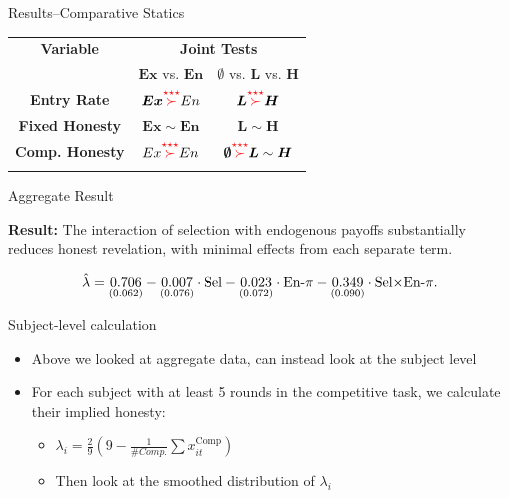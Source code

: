 \documentclass{beamer}
\begin{document}
\begin{frame}{Results--Comparative Statics}
    \begin{center}
        \begin{tabular}{ccc}
        \toprule \textbf{Variable} & \multicolumn{2}{c}{\textbf{Joint Tests}}\\ 
        \cmidrule{2-3}  & $\boldsymbol{Ex}$ vs. $\boldsymbol{En}$ & \textbf{$\emptyset$} vs. $\boldsymbol{L}$ vs. $\boldsymbol{H}$\\ 
        \midrule \textbf{Entry Rate} & $\boldsymbol{Ex}{\color{red}\stackrel{\star\star\star}{\succ}}En$ & $\boldsymbol{L}{\color{red}\stackrel{\star\star\star}{\succ}}\boldsymbol{H}$\\ 
        \textbf{Fixed Honesty} & $\boldsymbol{Ex}\sim\boldsymbol{En}$ & $\boldsymbol{L}\sim\boldsymbol{H}$\\ 
        \textbf{Comp. Honesty} & $Ex{\color{red}\stackrel{\star\star\star}{\succ}}En$ & $\boldsymbol{\emptyset}{\color{red}\stackrel{\star\star\star}{\succ}}\boldsymbol{L}\sim\boldsymbol{H}$\\ 
        \bottomrule  &  & \\ 
        \end{tabular}
    \end{center}
\end{frame}

\begin{frame}{Aggregate Result}\begin{center}

\textbf{Result: }The interaction of selection with endogenous payoffs
substantially reduces honest revelation, with minimal effects from
each separate term.
\end{center}

\[
\hat{\lambda}=\underset{(0.062)}{0.706}-\underset{(0.076)}{0.007}\cdot\text{Sel}-\underset{(0.072)}{0.023}\cdot\text{En-}\ensuremath{\pi}-\underset{(0.090)}{0.349}\cdot\text{Sel\ensuremath{\times\text{En-\ensuremath{\pi}}.}}
\]
\end{frame}

\begin{frame}{Subject-level calculation}
    \begin{itemize}
        \item Above we looked at aggregate data, can instead look at the subject
        level
        \item For each subject with at least 5 rounds in the competitive task, we
        calculate their implied honesty:
            \begin{itemize}
                \item $\lambda_{i}=\frac{2}{9}\left(9-\frac{1}{\#Comp.}\sum x_{it}^{\text{Comp}}\right)$
                \item Then look at the smoothed distribution of $\lambda_{i}$
            \end{itemize}
    \end{itemize}
\end{frame}
\end{document}
